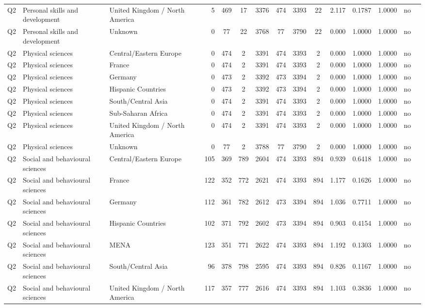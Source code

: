 \begin{longtable}{lllrcccccccccll}
Q2 & Personal skills and development & United Kingdom / North America & 5 & 469 & 17 & 3376 & 474 & 3393 & 22 & 2.117 & 0.1787 & 1.0000 & no \\
Q2 & Personal skills and development & Unknown & 0 & 77 & 22 & 3768 & 77 & 3790 & 22 & 0.000 & 1.0000 & 1.0000 & no \\
Q2 & Physical sciences & Central/Eastern Europe & 0 & 474 & 2 & 3391 & 474 & 3393 & 2 & 0.000 & 1.0000 & 1.0000 & no \\
Q2 & Physical sciences & France & 0 & 474 & 2 & 3391 & 474 & 3393 & 2 & 0.000 & 1.0000 & 1.0000 & no \\
Q2 & Physical sciences & Germany & 0 & 473 & 2 & 3392 & 473 & 3394 & 2 & 0.000 & 1.0000 & 1.0000 & no \\
Q2 & Physical sciences & Hispanic Countries & 0 & 473 & 2 & 3392 & 473 & 3394 & 2 & 0.000 & 1.0000 & 1.0000 & no \\
Q2 & Physical sciences & South/Central Asia & 0 & 474 & 2 & 3391 & 474 & 3393 & 2 & 0.000 & 1.0000 & 1.0000 & no \\
Q2 & Physical sciences & Sub-Saharan Africa & 0 & 474 & 2 & 3391 & 474 & 3393 & 2 & 0.000 & 1.0000 & 1.0000 & no \\
Q2 & Physical sciences & United Kingdom / North America & 0 & 474 & 2 & 3391 & 474 & 3393 & 2 & 0.000 & 1.0000 & 1.0000 & no \\
Q2 & Physical sciences & Unknown & 0 & 77 & 2 & 3788 & 77 & 3790 & 2 & 0.000 & 1.0000 & 1.0000 & no \\
Q2 & Social and behavioural sciences & Central/Eastern Europe & 105 & 369 & 789 & 2604 & 474 & 3393 & 894 & 0.939 & 0.6418 & 1.0000 & no \\
Q2 & Social and behavioural sciences & France & 122 & 352 & 772 & 2621 & 474 & 3393 & 894 & 1.177 & 0.1626 & 1.0000 & no \\
Q2 & Social and behavioural sciences & Germany & 112 & 361 & 782 & 2612 & 473 & 3394 & 894 & 1.036 & 0.7711 & 1.0000 & no \\
Q2 & Social and behavioural sciences & Hispanic Countries & 102 & 371 & 792 & 2602 & 473 & 3394 & 894 & 0.903 & 0.4154 & 1.0000 & no \\
Q2 & Social and behavioural sciences & MENA & 123 & 351 & 771 & 2622 & 474 & 3393 & 894 & 1.192 & 0.1303 & 1.0000 & no \\
Q2 & Social and behavioural sciences & South/Central Asia & 96 & 378 & 798 & 2595 & 474 & 3393 & 894 & 0.826 & 0.1167 & 1.0000 & no \\
Q2 & Social and behavioural sciences & United Kingdom / North America & 117 & 357 & 777 & 2616 & 474 & 3393 & 894 & 1.103 & 0.3836 & 1.0000 & no \\

\end{longtable}
